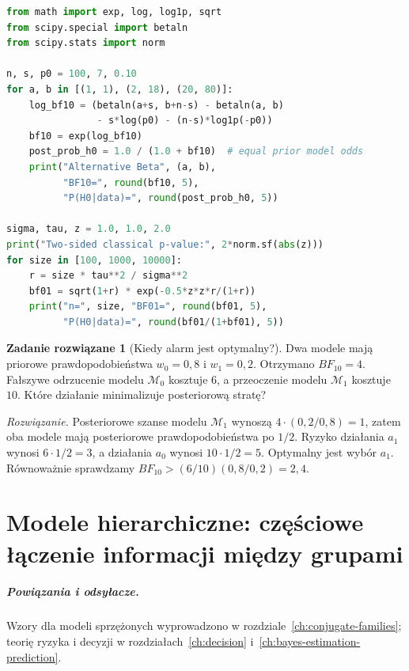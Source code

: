 \documentclass[11pt,a4paper,oneside]{report}
\numberwithin{equation}{chapter}
\theoremstyle{plain}
\theoremstyle{definition}
\newtheorem{zadanie}{Zadanie rozwiązane}[chapter]
\theoremstyle{remark}
\begin{document}
\begin{lstlisting}[language=Python,caption={Kompletny program: iloraz Bayesa dla wadliwych produktów i paradoks Jeffreysa--Lindleya (Python, SciPy).}]
from math import exp, log, log1p, sqrt
from scipy.special import betaln
from scipy.stats import norm

n, s, p0 = 100, 7, 0.10
for a, b in [(1, 1), (2, 18), (20, 80)]:
    log_bf10 = (betaln(a+s, b+n-s) - betaln(a, b)
                - s*log(p0) - (n-s)*log1p(-p0))
    bf10 = exp(log_bf10)
    post_prob_h0 = 1.0 / (1.0 + bf10)  # equal prior model odds
    print("Alternative Beta", (a, b),
          "BF10=", round(bf10, 5),
          "P(H0|data)=", round(post_prob_h0, 5))

sigma, tau, z = 1.0, 1.0, 2.0
print("Two-sided classical p-value:", 2*norm.sf(abs(z)))
for size in [100, 1000, 10000]:
    r = size * tau**2 / sigma**2
    bf01 = sqrt(1+r) * exp(-0.5*z*z*r/(1+r))
    print("n=", size, "BF01=", round(bf01, 5),
          "P(H0|data)=", round(bf01/(1+bf01), 5))
\end{lstlisting}

\begin{zadanie}[Kiedy alarm jest optymalny?]
Dwa modele mają priorowe prawdopodobieństwa $w_0=0{,}8$
i $w_1=0{,}2$. Otrzymano $BF_{10}=4$.
Fałszywe odrzucenie modelu $\mathcal M_0$ kosztuje $6$,
a przeoczenie modelu $\mathcal M_1$ kosztuje $10$.
Które działanie minimalizuje posteriorową stratę?
\par\emph{Rozwiązanie.} Posteriorowe szanse modelu
$\mathcal M_1$ wynoszą $4\cdot(0{,}2/0{,}8)=1$,
zatem oba modele mają posteriorowe prawdopodobieństwa po $1/2$.
Ryzyko działania $a_1$ wynosi $6\cdot1/2=3$,
a działania $a_0$ wynosi $10\cdot1/2=5$.
Optymalny jest wybór $a_1$. Równoważnie sprawdzamy
$BF_{10}>(6/10)(0{,}8/0{,}2)=2{,}4$.
\end{zadanie}

\chapter{Modele hierarchiczne: częściowe łączenie informacji między grupami}
\label{ch:hierarchical-bayes}
\paragraph{Powiązania i odsyłacze.} Wzory dla modeli sprzężonych wyprowadzono w rozdziale~\ref{ch:conjugate-families}; teorię ryzyka i decyzji w rozdziałach~\ref{ch:decision} i~\ref{ch:bayes-estimation-prediction}.
\end{document}
